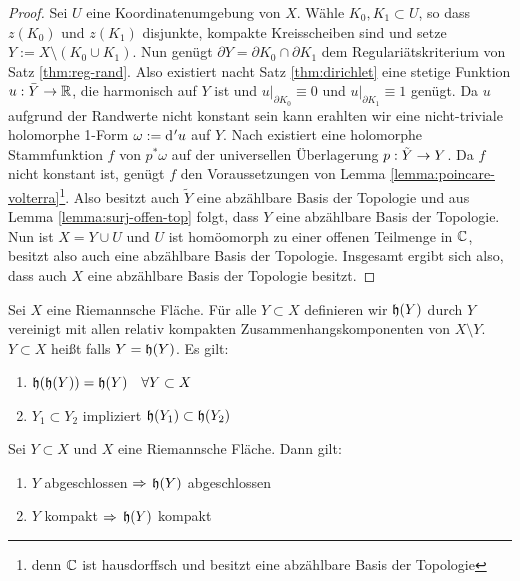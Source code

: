 \begin{proof}
  Sei $U$ eine Koordinatenumgebung von $X$. Wähle $K_0, K_1 \subset
  U$, so dass $z(K_0)$ und $z(K_1)$ disjunkte, kompakte Kreisscheiben
  sind und setze $Y := X \setminus (K_0 \cup K_1)$. 
  Nun genügt $\partial Y = \partial K_0 \cap \partial K_1$ dem
  Regulariätskriterium von Satz \ref{thm:reg-rand}. Also existiert
  nacht Satz \ref{thm:dirichlet} eine stetige
  Funktion $u: \bar Y \rightarrow \mathbb{R}$, die harmonisch auf $Y$ ist und
  $u|_{\partial K_0} \equiv 0$ und $u|_{\partial K_1} \equiv 1$
  genügt. Da $u$ aufgrund der Randwerte nicht konstant sein kann erahlten wir
  eine nicht-triviale holomorphe 1-Form $\omega := \d['u]$ auf $Y$. 
  Nach \cite[Kor. 10.6]{For} existiert eine holomorphe Stammfunktion
  $f$ von $p^\ast\omega$ auf der universellen Überlagerung $p: \tilde
  Y \rightarrow Y$. Da $f$ nicht konstant ist, genügt $f$ den Voraussetzungen von
  Lemma \ref{lemma:poincare-volterra}\footnote{denn $\mathbb{C}$ ist hausdorffsch
  und besitzt eine abzählbare Basis der Topologie}. Also besitzt auch
  $\tilde Y$ eine abzählbare Basis der Topologie und aus
  Lemma \ref{lemma:surj-offen-top} folgt, dass $Y$ eine abzählbare
  Basis der Topologie. Nun ist $X = Y \cup U$ und $U$ ist homöomorph
  zu einer offenen Teilmenge in $\mathbb{C}$, besitzt also auch eine
  abzählbare Basis der Topologie. 
  Insgesamt ergibt sich also, dass auch $X$ eine abzählbare Basis der
  Topologie besitzt.
\end{proof}

\begin{defin}
  Sei $X$ eine Riemannsche Fläche. Für alle $Y \subset X$ definieren
  wir $\mathfrak{h}(Y)$ durch $Y$ vereinigt mit allen relativ kompakten
  Zusammenhangskomponenten von $X \setminus Y$. $Y \subset X$ heißt
   falls $Y = \mathfrak{h}(Y)$. Es gilt:
  \begin{enumerate}
  \item $\mathfrak{h}(\mathfrak{h}(Y)) = \mathfrak{h}(Y) \quad \forall Y \subset X$ 
  \item $Y_1 \subset Y_2$ impliziert $\mathfrak{h}(Y_1) \subset \mathfrak{h}(Y_2)$
  \end{enumerate}
\end{defin}

\begin{thm}
  Sei $Y \subset X$ und $X$ eine Riemannsche Fläche. Dann gilt:
  \begin{enumerate}
  \item $Y$ abgeschlossen $\Rightarrow$ $\mathfrak{h}(Y)$ abgeschlossen
  \item $Y$ kompakt $\Rightarrow$ $\mathfrak{h}(Y)$ kompakt
  \end{enumerate}
\end{thm}


